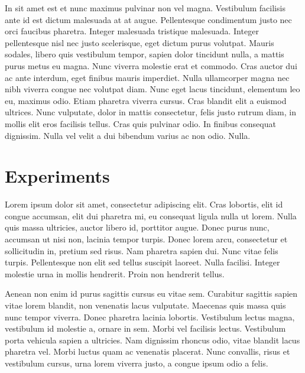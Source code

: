 \documentclass[a4paper]{article}
\begin{document}
In sit amet est et nunc maximus pulvinar non vel magna. Vestibulum facilisis ante id est dictum malesuada at at augue. Pellentesque condimentum justo nec orci faucibus pharetra. Integer malesuada tristique malesuada. Integer pellentesque nisl nec justo scelerisque, eget dictum purus volutpat. Mauris sodales, libero quis vestibulum tempor, sapien dolor tincidunt nulla, a mattis purus metus eu magna. Nunc viverra molestie erat et commodo. Cras auctor dui ac ante interdum, eget finibus mauris imperdiet. Nulla ullamcorper magna nec nibh viverra congue nec volutpat diam. Nunc eget lacus tincidunt, elementum leo eu, maximus odio. Etiam pharetra viverra cursus. Cras blandit elit a euismod ultrices. Nunc vulputate, dolor in mattis consectetur, felis justo rutrum diam, in mollis elit eros facilisis tellus. Cras quis pulvinar odio. In finibus consequat dignissim. Nulla vel velit a dui bibendum varius ac non odio. Nulla.

\section{Experiments}


Lorem ipsum dolor sit amet, consectetur adipiscing elit. Cras lobortis, elit id congue accumsan, elit dui pharetra mi, eu consequat ligula nulla ut lorem. Nulla quis massa ultricies, auctor libero id, porttitor augue. Donec purus nunc, accumsan ut nisi non, lacinia tempor turpis. Donec lorem arcu, consectetur et sollicitudin in, pretium sed risus. Nam pharetra sapien dui. Nunc vitae felis turpis. Pellentesque non elit sed tellus suscipit laoreet. Nulla facilisi. Integer molestie urna in mollis hendrerit. Proin non hendrerit tellus.

Aenean non enim id purus sagittis cursus eu vitae sem. Curabitur sagittis sapien vitae lorem blandit, non venenatis lacus vulputate. Maecenas quis massa quis nunc tempor viverra. Donec pharetra lacinia lobortis. Vestibulum lectus magna, vestibulum id molestie a, ornare in sem. Morbi vel facilisis lectus. Vestibulum porta vehicula sapien a ultricies. Nam dignissim rhoncus odio, vitae blandit lacus pharetra vel. Morbi luctus quam ac venenatis placerat. Nunc convallis, risus et vestibulum cursus, urna lorem viverra justo, a congue ipsum odio a felis.
\end{document}
